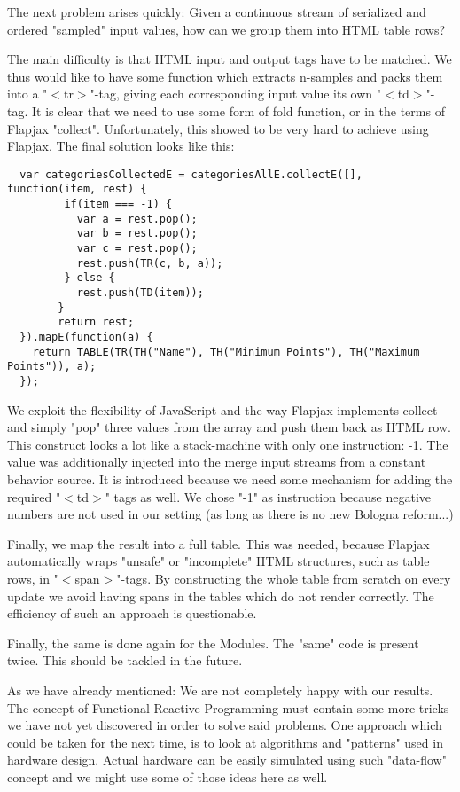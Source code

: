 The next problem arises quickly: Given a continuous stream of serialized and
ordered "sampled" input values, how can we group them into HTML table rows?

The main difficulty is that HTML input and output tags have to be matched. We
thus would like to have some function which extracts n-samples and packs them
into a "$<$tr$>$"-tag, giving each corresponding input value its own "$<$td$>$"-tag.
It is clear that we need to use some form of fold function, or in the terms of
Flapjax "collect". Unfortunately, this showed to be very hard to achieve using
Flapjax. The final solution looks like this:
{\footnotesize\begin{verbatim}
  var categoriesCollectedE = categoriesAllE.collectE([], function(item, rest) {
         if(item === -1) {
           var a = rest.pop();
           var b = rest.pop();
           var c = rest.pop();
           rest.push(TR(c, b, a));
         } else {
           rest.push(TD(item));
        }
        return rest;
  }).mapE(function(a) {
    return TABLE(TR(TH("Name"), TH("Minimum Points"), TH("Maximum Points")), a);
  });
\end{verbatim}}
We exploit the flexibility of JavaScript and the way Flapjax implements collect
and simply "pop" three values from the array and push them back as HTML row.
This construct looks a lot like a stack-machine with only one instruction: -1.
The value was additionally injected into the merge input streams from a constant
behavior source. It is introduced because we need some mechanism for adding the
required "$<$td$>$" tags as well. We chose "-1" as instruction because negative
numbers are not used in our setting (as long as there is no new Bologna reform...)

Finally, we map the result into a full table. This was needed, because Flapjax
automatically wraps "unsafe" or "incomplete" HTML structures, such as table
rows, in "$<$span$>$"-tags. By constructing the whole table from scratch on every update
we avoid having spans in the tables which do not render correctly. The efficiency
of such an approach is questionable.

Finally, the same is done again for the Modules. The "same" code is present twice.
This should be tackled in the future.

As we have already mentioned: We are not completely happy with our results.
The concept of Functional Reactive Programming must contain some more tricks we
have not yet discovered in order to solve said problems. One approach which could
be taken for the next time, is to look at algorithms and "patterns" used in hardware
design. Actual hardware can be easily simulated using such "data-flow" concept
and we might use some of those ideas here as well.
